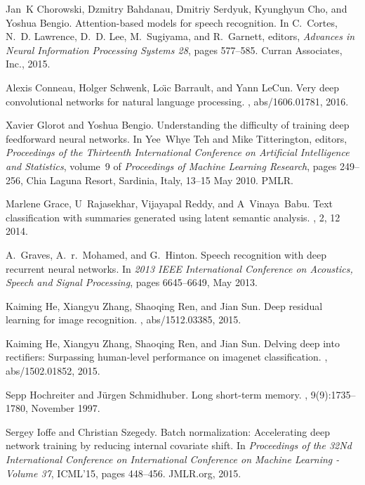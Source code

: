 \documentclass{article}
\begin{document}
\begin{thebibliography}{10}
Jan~K Chorowski, Dzmitry Bahdanau, Dmitriy Serdyuk, Kyunghyun Cho, and Yoshua
  Bengio.
\newblock Attention-based models for speech recognition.
\newblock In C.~Cortes, N.~D. Lawrence, D.~D. Lee, M.~Sugiyama, and R.~Garnett,
  editors, {\em Advances in Neural Information Processing Systems 28}, pages
  577--585. Curran Associates, Inc., 2015.

Alexis Conneau, Holger Schwenk, Lo{\"{\i}}c Barrault, and Yann LeCun.
\newblock Very deep convolutional networks for natural language processing.
, abs/1606.01781, 2016.

Xavier Glorot and Yoshua Bengio.
\newblock Understanding the difficulty of training deep feedforward neural
  networks.
\newblock In Yee~Whye Teh and Mike Titterington, editors, {\em Proceedings of
  the Thirteenth International Conference on Artificial Intelligence and
  Statistics}, volume~9 of {\em Proceedings of Machine Learning Research},
  pages 249--256, Chia Laguna Resort, Sardinia, Italy, 13--15 May 2010. PMLR.

Marlene Grace, U~Rajasekhar, Vijayapal Reddy, and A~Vinaya~Babu.
\newblock Text classification with summaries generated using latent semantic
  analysis.
, 2, 12 2014.

A.~Graves, A.~r.~Mohamed, and G.~Hinton.
\newblock Speech recognition with deep recurrent neural networks.
\newblock In {\em 2013 IEEE International Conference on Acoustics, Speech and
  Signal Processing}, pages 6645--6649, May 2013.

Kaiming He, Xiangyu Zhang, Shaoqing Ren, and Jian Sun.
\newblock Deep residual learning for image recognition.
, abs/1512.03385, 2015.

Kaiming He, Xiangyu Zhang, Shaoqing Ren, and Jian Sun.
\newblock Delving deep into rectifiers: Surpassing human-level performance on
  imagenet classification.
, abs/1502.01852, 2015.

Sepp Hochreiter and J\"{u}rgen Schmidhuber.
\newblock Long short-term memory.
, 9(9):1735--1780, November 1997.

Sergey Ioffe and Christian Szegedy.
\newblock Batch normalization: Accelerating deep network training by reducing
  internal covariate shift.
\newblock In {\em Proceedings of the 32Nd International Conference on
  International Conference on Machine Learning - Volume 37}, ICML'15, pages
  448--456. JMLR.org, 2015.


\end{thebibliography}
\end{document}
